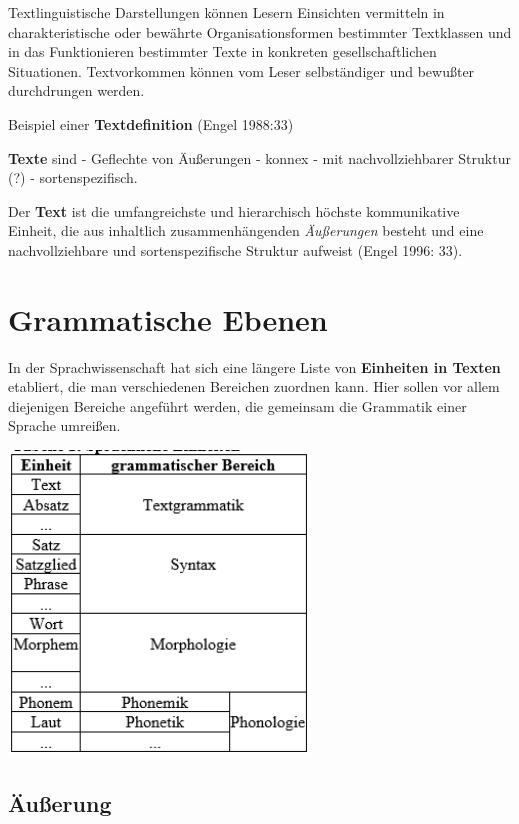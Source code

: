 \documentclass[
  letterpaper,
  DIV=11,
  numbers=noendperiod]{scrreprt}
\begin{document}
Textlinguistische Darstellungen können Lesern Einsichten vermitteln in
charakteristische oder bewährte Organisationsformen bestimmter
Textklassen und in das Funktionieren bestimmter Texte in konkreten
gesellschaftlichen Situationen. Textvorkommen können vom Leser
selbständiger und bewußter durchdrungen werden.

Beispiel einer \textbf{Textdefinition} (Engel 1988:33)

\textbf{Texte} sind - Geflechte von Äußerungen - konnex - mit
nachvollziehbarer Struktur (?) - sortenspezifisch.

Der \textbf{Text} ist die umfangreichste und hierarchisch höchste
kommunikative Einheit, die aus inhaltlich zusammenhängenden
\emph{Äußerungen} besteht und eine nachvollziehbare und
sortenspezifische Struktur aufweist (Engel 1996: 33).

\hypertarget{grammatische-ebenen}{%
\section{Grammatische Ebenen}\label{grammatische-ebenen}}

In der Sprachwissenschaft hat sich eine längere Liste von
\textbf{Einheiten in Texten} etabliert, die man verschiedenen Bereichen
zuordnen kann. Hier sollen vor allem diejenigen Bereiche angeführt
werden, die gemeinsam die Grammatik einer Sprache umreißen.

\includegraphics[width=0.6\textwidth,height=\textheight]{./pictures/grammatische_bereiche.png}

\hypertarget{uxe4uuxdferung}{%
\subsection{Äußerung}\label{uxe4uuxdferung}}
\end{document}
